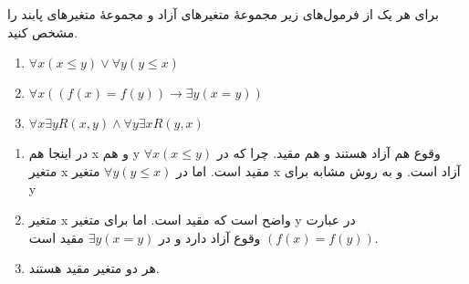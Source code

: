 
	برای هر یک از فرمول‌های زیر مجموعهٔ متغیرهای آزاد و مجموعهٔ متغیرهای پابند را مشخص کنید.
	\begin{enumerate}[label=(\alph*)]
		\item $\forall x (x \leq y) \vee \forall y (y \leq x)$
		\item $\forall x ((f(x) = f(y)) \rightarrow \exists y (x = y))$
		\item $\forall x \exists y R(x, y) \wedge \forall y \exists x R(y, x)$
	\end{enumerate}
	
	\quad\vspace{0.5cm}
	\begin{ans}
		\begin{enumerate}[label = (\alph*)]
			\item در اینجا هم x و  هم y وقوع هم آزاد هستند و هم مقید.
			چرا که در
			$\forall x (x \leq y)$
			متغیر x مقید است. اما در 
			$\forall y (y \leq x)$
			متغیر x آزاد است. و به روش مشابه برای y
			\item متغیر x واضح است که مقید است.
			اما برای متغیر y در عبارت
			$(f(x) = f(y))$
			وقوع آزاد دارد و در 
			$\exists y (x = y)$
			مقید است.
			\item هر دو متغیر مقید هستند.
		\end{enumerate}
	\end{ans}
